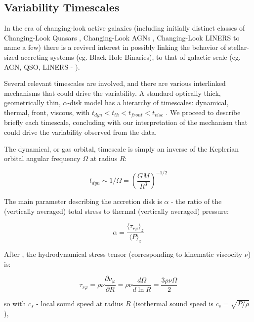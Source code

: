 \documentclass[twocolumn]{aastex62}
\begin{document}
\subsection{Variability Timescales}

In the era of changing-look active galaxies (including initially distinct classes of Changing-Look Quasars \citep{lamassa2015, macleod2019}, Changing-Look AGNs \citep{marchese2012, bianchi2009,risaliti2009}, Changing-Look LINERS \citep{frederick2019} to name a few) there is a revived interest in possibly linking the behavior of stellar-sized accreting systems (eg. Black Hole Binaries),  to that of galactic scale (eg. AGN, QSO, LINERS  - \citealt{noda2018, ruan2019}). 

Several relevant timescales are involved, and there are various interlinked mechanisms that could drive the variability. A standard optically thick, geometrically thin, $\alpha$-disk model has a hierarchy of timescales: dynamical, thermal, front, viscous, with   $t_{dyn} < t_{th} < t_{front}  < t_{visc} $ \citep{netzer2013, frank2002}. We proceed to describe briefly each timescale, concluding with our interpretation of the mechanism that could drive the variability observed from the data. 

The dynamical, or gas orbital, timescale is simply  an inverse of the Keplerian orbital angular frequency $ \Omega$  at radius $R$: 

\begin{equation}
t_{dyn} {\sim}  1 / \Omega = \left( \frac{GM}{R^{3}}\right)^{-1/2}
\end{equation}


The main parameter  describing the accretion disk is $\alpha$ - the ratio of the (vertically averaged) total stress to thermal (vertically averaged) pressure: 

\begin{equation}
\alpha= \frac{\langle \tau_{r\varphi}  \rangle_{z} }{\langle P \rangle _{z}} 
\end{equation}


After \cite{lasota2016},  the hydrodynamical stress tensor (corresponding to  kinematic viscocity $\nu$) is:

\begin{equation}
\tau_{r\varphi } = \rho \nu \frac{\partial v_{\varphi}}{\partial R} = \rho \nu \frac{d \Omega}{d \ln{R}} = \frac{3 \rho \nu \Omega}{2}  
\end{equation}

so  with  $c_{s}$ -  local sound speed at radius $R$ (isothermal sound speed is $c_{s} = \sqrt{P/\rho}$),
\end{document}
